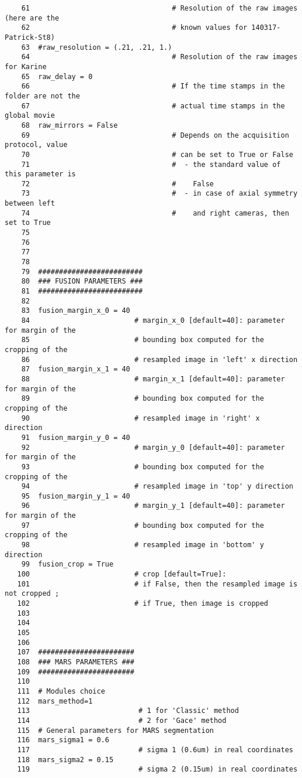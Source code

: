 \begin{verbatim}
    61	                                # Resolution of the raw images (here are the 
    62									# known values for 140317-Patrick-St8)
    63	#raw_resolution = (.21, .21, 1.) 
    64	                                # Resolution of the raw images for Karine
    65	raw_delay = 0 					
    66	                                # If the time stamps in the folder are not the
    67									# actual time stamps in the global movie
    68	raw_mirrors = False  			
    69	                                # Depends on the acquisition protocol, value 
    70									# can be set to True or False
    71									#  - the standard value of this parameter is 
    72									#    False
    73									#  - in case of axial symmetry between left 
    74									#    and right cameras, then set to True
    75	
    76	
    77	
    78	
    79	#########################
    80	### FUSION PARAMETERS ###
    81	#########################
    82	
    83	fusion_margin_x_0 = 40 
    84	                       # margin_x_0 [default=40]: parameter for margin of the
    85						   # bounding box computed for the cropping of the 
    86						   # resampled image in 'left' x direction 
    87	fusion_margin_x_1 = 40 
    88	                       # margin_x_1 [default=40]: parameter for margin of the
    89					       # bounding box computed for the cropping of the 
    90					       # resampled image in 'right' x direction
    91	fusion_margin_y_0 = 40 
    92	                       # margin_y_0 [default=40]: parameter for margin of the
    93						   # bounding box computed for the cropping of the 
    94						   # resampled image in 'top' y direction
    95	fusion_margin_y_1 = 40 
    96	                       # margin_y_1 [default=40]: parameter for margin of the
    97						   # bounding box computed for the cropping of the 
    98						   # resampled image in 'bottom' y direction
    99	fusion_crop = True     
   100	                       # crop [default=True]: 
   101	                       # if False, then the resampled image is not cropped ; 
   102						   # if True, then image is cropped
   103	
   104	
   105	
   106	
   107	#######################
   108	### MARS PARAMETERS ###
   109	#######################
   110	
   111	# Modules choice
   112	mars_method=1 			
   113	                        # 1 for 'Classic' method
   114				  			# 2 for 'Gace' method
   115	# General parameters for MARS segmentation
   116	mars_sigma1 = 0.6  		
   117	                        # sigma 1 (0.6um) in real coordinates
   118	mars_sigma2 = 0.15 		
   119	                        # sigma 2 (0.15um) in real coordinates

\end{verbatim}
